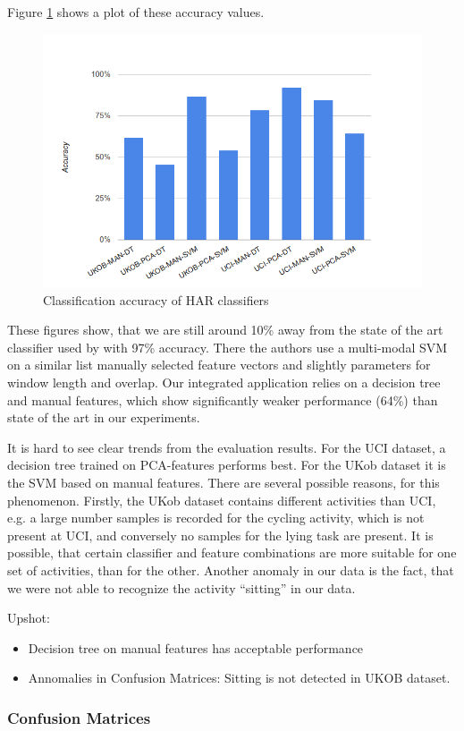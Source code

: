 Figure \ref{fig:har_eval} shows a plot of these accuracy values.
\begin{figure}[ht]
  \centering
  \includegraphics[width= 0.5 \textwidth]{img/har/accuracy_plot.png}
  \caption{Classification accuracy of HAR classifiers}
  \label{fig:har_eval}
\end{figure}

These figures show, that we are still around 10\% away from the state
of the art classifier used by \cite{Anguita} with 97\% accuracy. There
the authors use a multi-modal SVM on a similar list manually selected
feature vectors and slightly parameters for window length and overlap.
Our integrated application relies on a decision tree and manual
features, which show significantly weaker performance (64\%) than
state of the art in our experiments.

It is hard to see clear trends from the evaluation results.  For the
UCI dataset, a decision tree trained on PCA-features performs best.
For the UKob dataset it is the SVM based on manual features. There
are several possible reasons, for this phenomenon.  Firstly, the UKob
dataset contains different activities than UCI, e.g. a large number
samples is recorded for the cycling activity, which is not present at
UCI, and conversely no samples for the lying task are present. It is
possible, that certain classifier and feature combinations are more
suitable for one set of activities, than for the other. Another
anomaly in our data is the fact, that we were not able to recognize
the activity ``sitting'' in our data. 

Upshot:
\begin{itemize}
\item  Decision tree on manual features has acceptable performance
\item  Annomalies in Confusion Matrices: Sitting is not detected in UKOB dataset.
\end{itemize}

\subsubsection*{\bf Confusion Matrices}



